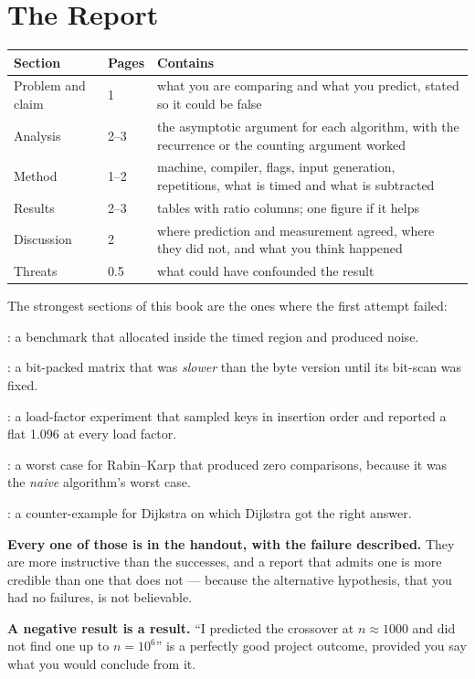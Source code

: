 \section{The Report}

\begin{conceptbox}[Structure]
\begin{longtable}{@{}L{3.2cm}L{1.6cm}L{9.2cm}@{}}
\toprule
{}
\textbf{Section} & \textbf{Pages} & \textbf{Contains} \\
\midrule
\endhead
Problem and claim & 1 & what you are comparing and what you predict, stated
  so it could be false \\
Analysis & 2--3 & the asymptotic argument for each algorithm, with the
  recurrence or the counting argument worked \\
Method & 1--2 & machine, compiler, flags, input generation, repetitions, what
  is timed and what is subtracted \\
Results & 2--3 & tables with ratio columns; one figure if it helps \\
Discussion & 2 & where prediction and measurement agreed, where they did not,
  and what you think happened \\
Threats & 0.5 & what could have confounded the result \\
\bottomrule
\end{longtable}
\end{conceptbox}

\begin{alertbox}
The strongest sections of this book are the ones where the first attempt
failed:

\begin{tight}
  \item {}: a benchmark that allocated inside the timed region
        and produced noise.
  \item {}: a bit-packed matrix that was \emph{slower} than the
        byte version until its bit-scan was fixed.
  \item {}: a load-factor experiment that sampled keys in
        insertion order and reported a flat 1.096 at every load factor.
  \item {}: a worst case for Rabin--Karp that produced zero
        comparisons, because it was the \emph{naive} algorithm's worst case.
  \item {}: a counter-example for Dijkstra on which Dijkstra
        got the right answer.
\end{tight}

\smallskip
\textbf{Every one of those is in the handout, with the failure described.} They
are more instructive than the successes, and a report that admits one is more
credible than one that does not --- because the alternative hypothesis, that
you had no failures, is not believable.

\smallskip
\textbf{A negative result is a result.} ``I predicted the crossover at
$n \approx 1000$ and did not find one up to $n = 10^{6}$'' is a perfectly good
project outcome, provided you say what you would conclude from it.
\end{alertbox}


